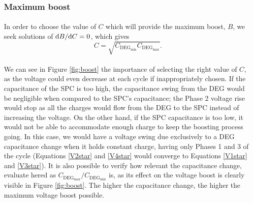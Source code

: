 \subsubsection{Maximum boost}

\paragraph{} In order to choose the value of $C$ which will provide the maximum boost, $B$, we seek solutions of ${\mathrm{d}B}/{\mathrm{d}C}=0$, which gives
\begin{equation}\label{eq:bestC}
C= \sqrt{C_{\text{DEG}_{\text{min}}}C_{\text{DEG}_{\text{max}}}}.
\end{equation}

\paragraph{} We can see in Figure \ref{fig:boost} the importance of selecting the right value of $C$, as the voltage could even decrease at each cycle if inappropriately chosen. If the capacitance of the SPC is too high, the capacitance swing from the DEG would be negligible when compared to the SPC's  capacitance; the Phase 2 voltage rise would stop as all the charges would flow from the DEG to the SPC instead of increasing the voltage. On the other hand, if the SPC capacitance is too low, it would not be able to accommodate enough charge to keep the boosting process going. In this case, we would have a voltage swing due exclusively to a DEG capacitance change when it holds constant charge, having only Phases 1 and 3 of the cycle (Equations \ref{V2star} and \ref{V4star} would converge to Equations \ref{V1star} and \ref{V3star}). It is also possible to verify how relevant the capacitance change, evaluate hered as $C_{\text{DEG}_\text{max}}/C_{\text{DEG}_\text{min}}$ is, as its effect on the voltage boost is clearly visible in Figure \ref{fig:boost}. The higher the capacitance change, the higher the maximum voltage boost possible.

